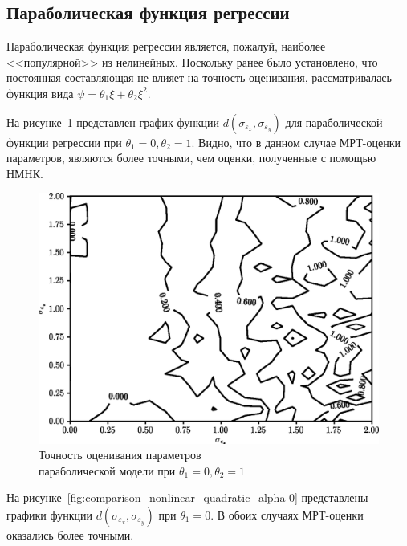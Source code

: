 \subsection{Параболическая функция регрессии}

Параболическая функция регрессии является, пожалуй, наиболее <<популярной>> из нелинейных.
Поскольку ранее было установлено, что постоянная составляющая не влияет на точность оценивания,
рассматривалась функция вида \( \psi = \theta_1 \xi + \theta_2 \xi^2 \).

На рисунке~\ref{fig:comparison_nonlinear_quadratic_alpha-0_beta-1}
представлен график функции \( d(\sigma_{\varepsilon_x}, \sigma_{\varepsilon_y}) \)
для параболической функции регрессии при \( \theta_1 = 0, \theta_2 = 1 \).
Видно, что в данном случае МРТ-оценки параметров, являются более точными,
чем оценки, полученные с помощью НМНК.

\begin{figure}[h!]
  \centering
  \includegraphics[width=135mm]{fig/nonlinear/quadratic/alpha-0_beta-1.png}
  \caption{
    Точность оценивания параметров \\
    параболической модели при \( \theta_1 = 0, \theta_2 = 1 \)
  }\label{fig:comparison_nonlinear_quadratic_alpha-0_beta-1}
\end{figure}

На рисунке~\ref{fig:comparison_nonlinear_quadratic_alpha-0}
представлены графики функции \( d(\sigma_{\varepsilon_x}, \sigma_{\varepsilon_y}) \)
при \( \theta_1 = 0 \). В обоих случаях МРТ-оценки оказались более точными.


